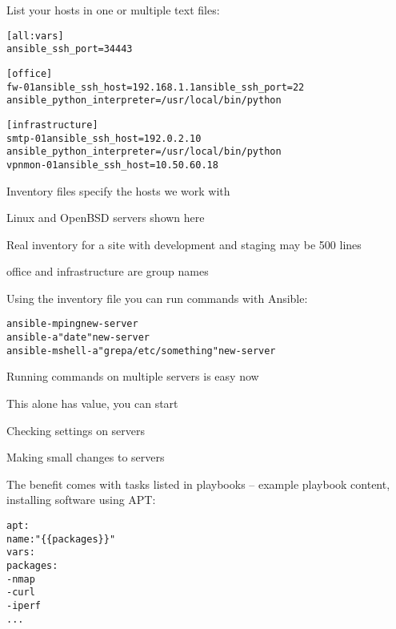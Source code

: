 \documentclass[Screen16to9,17pt]{foils}
\begin{document}

List your hosts in one or multiple text files:
\begin{alltt}\footnotesize
[all:vars]
ansible_ssh_port=34443

[office]
fw-01 ansible_ssh_host=192.168.1.1 ansible_ssh_port=22
ansible_python_interpreter=/usr/local/bin/python

[infrastructure]
smtp-01     ansible_ssh_host=192.0.2.10
ansible_python_interpreter=/usr/local/bin/python
vpnmon-01   ansible_ssh_host=10.50.60.18

\end{alltt}

\begin{list2}
\item Inventory files specify the hosts we work with
\item Linux and OpenBSD servers shown here
\item Real inventory for a site with development and staging may be 500 lines
\item office and infrastructure are group names
\end{list2}



Using the inventory file you can run commands with Ansible:

\begin{alltt}\footnotesize
  ansible -m ping new-server
  ansible -a "date" new-server
  ansible -m shell -a "grep a /etc/something" new-server
\end{alltt}

\begin{list2}
\item Running commands on multiple servers is easy now
\item This alone has value, you can start
\item Checking settings on servers
\item Making small changes to servers
\end{list2}



The benefit comes with tasks listed in playbooks -- example playbook content, installing software using APT:
\begin{alltt}\small
apt:
    name: "\{\{ packages \}\}"
    vars:
      packages:
        - nmap
        - curl
        - iperf
        ...
\end{alltt}
\end{document}
